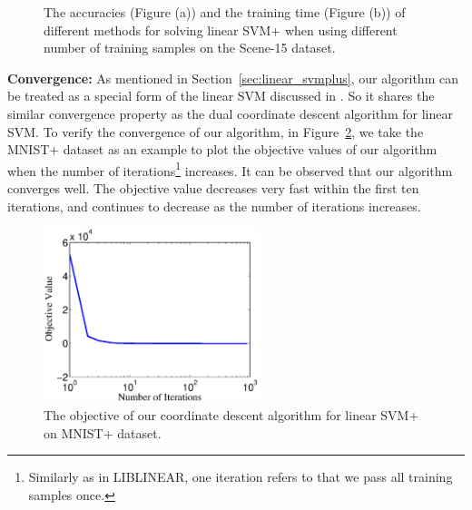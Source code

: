 \begin{figure}
\centering
{}
\caption{The accuracies (Figure (a)) and the training time (Figure (b)) of different methods for solving linear SVM+ when using different number of training samples on the Scene-15 dataset.}
\label{fig:linear}
\end{figure}

\noindent\textbf{Convergence:} As mentioned in
Section~\ref{sec:linear_svmplus}, our algorithm can be treated as a
special form of the linear SVM discussed in \cite{DCD_linearsvm}. So
it shares the similar convergence property as the dual coordinate
descent algorithm for linear SVM. To verify the convergence of our
algorithm, in Figure~\ref{fig:mnist_obj}, we take the MNIST+ dataset
as an example to plot the objective values of our algorithm when the
number of iterations\footnote{Similarly as in LIBLINEAR, one iteration
  refers to that we pass all training samples once.} increases. It can
be observed that our algorithm converges well. The objective value
decreases very fast within the first ten iterations, and continues to
decrease as the number of iterations increases.
\begin{figure}
\centering
\includegraphics[width=0.56\textwidth]{./svmplus/obj_mnist.eps}
\caption{The objective of our coordinate descent algorithm for linear SVM+ on MNIST+ dataset.}
\label{fig:mnist_obj}
\end{figure}


